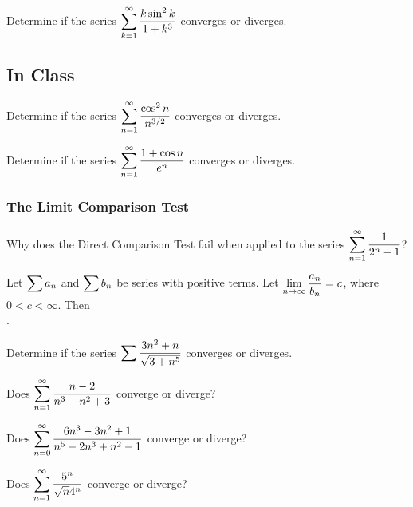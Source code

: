 \documentclass[notes]{subfiles}
\begin{document}
		\begin{ex}
			Determine if the series $\displaystyle \sum_{k =1}^\infty \dfrac{k\sin^2k }{1 + k^3}$ converges or diverges.
		\end{ex}
			\newpage
			
	\subsection*{In Class}
		\begin{ex}
			Determine if the series $\displaystyle \sum_{n=1}^\infty \dfrac{\cos^2 n}{n^{3/2}}$ converges or diverges.
		\end{ex}
		
		\begin{ex}
			Determine if the series $\displaystyle \sum_{n =1}^\infty \dfrac{1+\cos n}{e^n}$ converges or diverges.
		\end{ex}
	\subsubsection*{The Limit Comparison Test}
		\begin{ex}
			Why does the Direct Comparison Test fail when applied to the series $\displaystyle \sum_{n=1}^\infty \dfrac{1}{2^n-1}$?
		\end{ex}
		
		\begin{rmk}
			Let $\displaystyle \sum a_n$ and $\displaystyle \sum b_n$ be series with positive terms.  Let $\displaystyle \lim_{n\to\infty} \dfrac{a_n}{b_n} = c$, where $0 < c < \infty$.  Then\\[20pt] .
		\end{rmk}
			\newpage
		
		\begin{ex}
			Determine if the series $\displaystyle \sum \dfrac{3n^2 + n}{\sqrt{3 + n^5}}$ converges or diverges.
		\end{ex}
			
		\begin{ex}
			Does $\displaystyle \sum_{n = 1}^\infty \dfrac{n-2}{n^3-n^2 + 3}$ converge or diverge?
		\end{ex}	
			
		\begin{ex}
			Does $\displaystyle \sum_{n=0}^\infty \dfrac{6n^3 - 3n^2 +1}{n^5 -2n^3 + n^2-1}$ converge or diverge?
		\end{ex}
			
		\begin{ex}
			Does $\displaystyle \sum_{n = 1}^\infty \dfrac{5^n}{\sqrt{n}4^n}$ converge or diverge?
		\end{ex}
			\newpage
			
\end{document}
